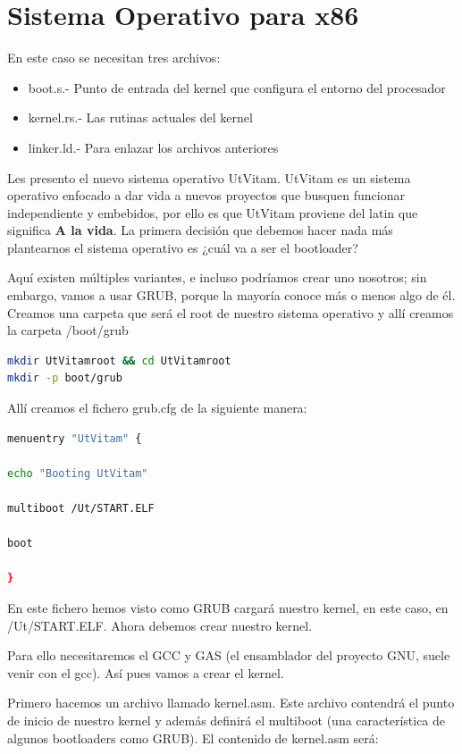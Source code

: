 \documentclass[12pt, twoside]{report}
\begin{document}
\chapter{Sistema Operativo para x86}

En este caso se necesitan tres archivos:
\begin{itemize}
\item boot.s.- Punto de entrada del kernel que configura el entorno del procesador
\item kernel.rs.- Las rutinas actuales del kernel
\item linker.ld.- Para enlazar los archivos anteriores 
\end{itemize}


Les presento el nuevo sistema operativo UtVitam. UtVitam es un sistema operativo enfocado a dar vida a nuevos proyectos que busquen funcionar independiente y embebidos, por ello es que UtVitam proviene del latin que significa \textbf{A la vida}. La primera decisión que debemos hacer nada más plantearnos el sistema operativo es ¿cuál va a ser el bootloader?

Aquí existen múltiples variantes, e incluso podríamos crear uno nosotros; sin embargo, vamos a usar GRUB, porque la mayoría conoce más o menos algo de él. Creamos una carpeta que será el root de nuestro sistema operativo y allí creamos la carpeta /boot/grub

\begin{lstlisting}[language=bash]
mkdir UtVitamroot && cd UtVitamroot
mkdir -p boot/grub
\end{lstlisting}

Allí creamos el fichero grub.cfg de la siguiente manera:

\begin{lstlisting}[language=bash]
menuentry "UtVitam" {

echo "Booting UtVitam"

multiboot /Ut/START.ELF

boot

}
\end{lstlisting}


En este fichero hemos visto como GRUB cargará nuestro kernel, en este caso, en /Ut/START.ELF. Ahora debemos crear nuestro kernel.

Para ello necesitaremos el GCC y GAS (el ensamblador del proyecto GNU, suele venir con el gcc). Así pues vamos a crear el kernel.

Primero hacemos un archivo llamado kernel.asm. Este archivo contendrá el punto de inicio de nuestro kernel y además definirá el multiboot (una característica de algunos bootloaders como GRUB). El contenido de kernel.asm será:
\end{document}
